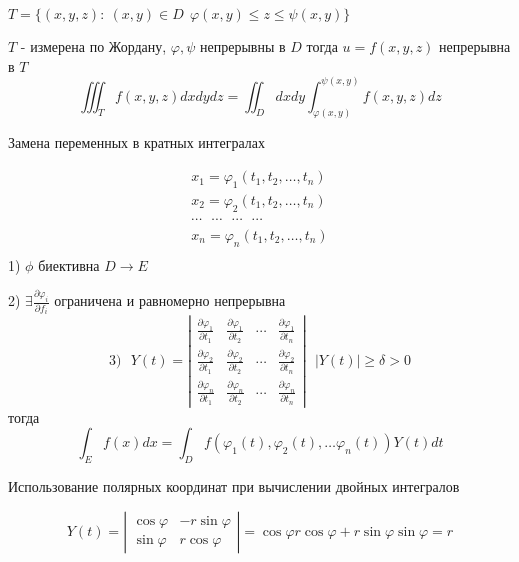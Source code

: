 \begin{theorem}
  $T = \{ (x, y, z): ~ (x, y) \in D ~~ \varphi(x, y) \le z \le \psi(x, y) \}$

  $T$ - измерена по Жордану, $\varphi, \psi$ непрерывны в $D$ тогда
  $u = f(x, y, z)$ непрерывна в $T$
  $$
  \iiint_T f(x,y,z) dxdydz = \iint_D dx dy \int_{\varphi(x,y)}^{\psi(x,y)}
  f(x,y,z)dz
  $$
\end{theorem}

\begin{title}[\Large]
  Замена переменных в кратных интегралах
\end{title}

$$
\begin{array}{c}
  x_1 = \varphi_1(t_1, t_2, \ldots, t_n) \\
  x_2 = \varphi_2(t_1, t_2, \ldots, t_n) \\
  \cdots ~~~ \cdots ~~~ \cdots ~~~ \cdots \\
  x_n = \varphi_n(t_1, t_2, \ldots, t_n) \\
\end{array}
$$
1) $\phi$ биективна $D \to E$

2) $\exists \frac{\partial \varphi_i}{\partial f_i}$ ограничена и равномерно
непрерывна
$$
3) ~~~ Y(t) =
\left|
\begin{array}{cccc}
  \frac{\partial \varphi_1}{\partial t_1} &
  \frac{\partial \varphi_1}{\partial t_2} &
  \cdots &
  \frac{\partial \varphi_1}{\partial t_n} \\

  \frac{\partial \varphi_2}{\partial t_1} &
  \frac{\partial \varphi_2}{\partial t_2} &
  \cdots &
  \frac{\partial \varphi_2}{\partial t_n} \\

  \frac{\partial \varphi_n}{\partial t_1} &
  \frac{\partial \varphi_n}{\partial t_2} &
  \cdots &
  \frac{\partial \varphi_n}{\partial t_n}
\end{array}
\right| ~~~ |Y(t)| \ge \delta > 0
$$
тогда
$$
\int_E f(x) dx = \int_D f(\varphi_1(t), \varphi_2(t), \ldots \varphi_n(t))
Y(t)dt
$$

\begin{title}[\Large]
  Использование полярных координат при вычислении двойных интегралов
\end{title}
$$
Y(t) =
\left|
\begin{array}{cc}
  \cos \varphi & -r \sin \varphi \\
  \sin \varphi & r \cos \varphi
\end{array}
\right| =
\cos \varphi r \cos \varphi + r \sin \varphi \sin \varphi = r
$$

